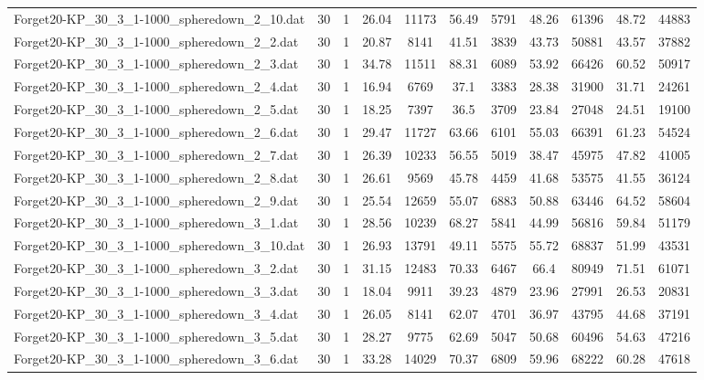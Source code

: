 \begin{table}[!ht]
\begin{tabular}{lcccccccccc}
Forget20-KP\_30\_3\_1-1000\_spheredown\_2\_10.dat & 30 & 1 & 26.04 & 11173 & 56.49 & 5791 & 48.26 & 61396 & 48.72 & 44883 \\
Forget20-KP\_30\_3\_1-1000\_spheredown\_2\_2.dat & 30 & 1 & 20.87 & 8141 & 41.51 & 3839 & 43.73 & 50881 & 43.57 & 37882 \\
Forget20-KP\_30\_3\_1-1000\_spheredown\_2\_3.dat & 30 & 1 & 34.78 & 11511 & 88.31 & 6089 & 53.92 & 66426 & 60.52 & 50917 \\
Forget20-KP\_30\_3\_1-1000\_spheredown\_2\_4.dat & 30 & 1 & 16.94 & 6769 & 37.1 & 3383 & 28.38 & 31900 & 31.71 & 24261 \\
Forget20-KP\_30\_3\_1-1000\_spheredown\_2\_5.dat & 30 & 1 & 18.25 & 7397 & 36.5 & 3709 & 23.84 & 27048 & 24.51 & 19100 \\
Forget20-KP\_30\_3\_1-1000\_spheredown\_2\_6.dat & 30 & 1 & 29.47 & 11727 & 63.66 & 6101 & 55.03 & 66391 & 61.23 & 54524 \\
Forget20-KP\_30\_3\_1-1000\_spheredown\_2\_7.dat & 30 & 1 & 26.39 & 10233 & 56.55 & 5019 & 38.47 & 45975 & 47.82 & 41005 \\
Forget20-KP\_30\_3\_1-1000\_spheredown\_2\_8.dat & 30 & 1 & 26.61 & 9569 & 45.78 & 4459 & 41.68 & 53575 & 41.55 & 36124 \\
Forget20-KP\_30\_3\_1-1000\_spheredown\_2\_9.dat & 30 & 1 & 25.54 & 12659 & 55.07 & 6883 & 50.88 & 63446 & 64.52 & 58604 \\
Forget20-KP\_30\_3\_1-1000\_spheredown\_3\_1.dat & 30 & 1 & 28.56 & 10239 & 68.27 & 5841 & 44.99 & 56816 & 59.84 & 51179 \\
Forget20-KP\_30\_3\_1-1000\_spheredown\_3\_10.dat & 30 & 1 & 26.93 & 13791 & 49.11 & 5575 & 55.72 & 68837 & 51.99 & 43531 \\
Forget20-KP\_30\_3\_1-1000\_spheredown\_3\_2.dat & 30 & 1 & 31.15 & 12483 & 70.33 & 6467 & 66.4 & 80949 & 71.51 & 61071 \\
Forget20-KP\_30\_3\_1-1000\_spheredown\_3\_3.dat & 30 & 1 & 18.04 & 9911 & 39.23 & 4879 & 23.96 & 27991 & 26.53 & 20831 \\
Forget20-KP\_30\_3\_1-1000\_spheredown\_3\_4.dat & 30 & 1 & 26.05 & 8141 & 62.07 & 4701 & 36.97 & 43795 & 44.68 & 37191 \\
Forget20-KP\_30\_3\_1-1000\_spheredown\_3\_5.dat & 30 & 1 & 28.27 & 9775 & 62.69 & 5047 & 50.68 & 60496 & 54.63 & 47216 \\
Forget20-KP\_30\_3\_1-1000\_spheredown\_3\_6.dat & 30 & 1 & 33.28 & 14029 & 70.37 & 6809 & 59.96 & 68222 & 60.28 & 47618 \\

\end{tabular}
\end{table}
